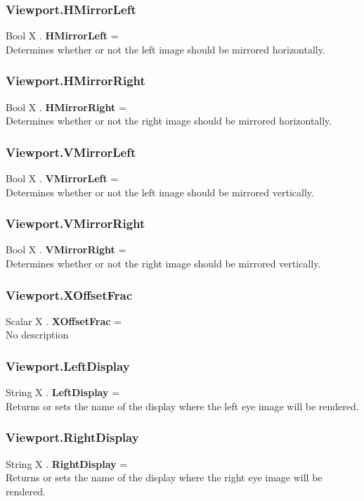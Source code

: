 \documentclass[10pt]{book}
\begin{document}
\subsubsection{Viewport.HMirrorLeft \label{F:Viewport:HMirrorLeft}}
Bool X . \textbf{HMirrorLeft} = \\
Determines whether or not the left image should be mirrored horizontally.


\subsubsection{Viewport.HMirrorRight \label{F:Viewport:HMirrorRight}}
Bool X . \textbf{HMirrorRight} = \\
Determines whether or not the right image should be mirrored horizontally.

\subsubsection{Viewport.VMirrorLeft \label{F:Viewport:VMirrorLeft}}
Bool X . \textbf{VMirrorLeft} = \\
Determines whether or not the left image should be mirrored vertically.

\subsubsection{Viewport.VMirrorRight \label{F:Viewport:VMirrorRight}}
Bool X . \textbf{VMirrorRight} = \\
Determines whether or not the right image should be mirrored vertically.

\subsubsection{Viewport.XOffsetFrac \label{F:Viewport:XOffsetFrac}}
Scalar X . \textbf{XOffsetFrac} = \\
No description

\subsubsection{Viewport.LeftDisplay \label{F:Viewport:LeftDisplay}}
String X . \textbf{LeftDisplay} = \\
Returns or sets the name of the display where the left eye image will be rendered.

\subsubsection{Viewport.RightDisplay \label{F:Viewport:RightDisplay}}
String X . \textbf{RightDisplay} = \\
Returns or sets the name of the display where the right eye image will be rendered.
\end{document}
